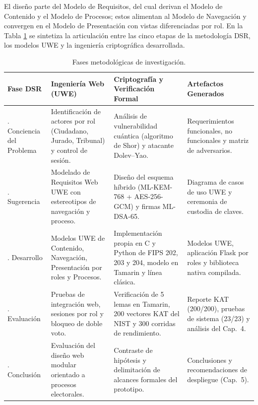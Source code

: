 El diseño parte del Modelo de Requisitos, del cual derivan el Modelo de Contenido y el Modelo de Procesos; estos alimentan al Modelo de Navegación y convergen en el Modelo de Presentación con vistas diferenciadas por rol. En la Tabla \ref{tab:mapeo_dsr_uwe_cripto} se sintetiza la articulación entre las cinco etapas de la metodología DSR, los modelos UWE y la ingeniería criptográfica desarrollada.

\begin{table}[!htbp]
	\centering
	\renewcommand{\arraystretch}{1.22}
	\footnotesize
	\begin{tabularx}{\textwidth}{|>{\bfseries\raggedright\arraybackslash}p{2.5cm}|>{\raggedright\arraybackslash}p{4.3cm}|>{\raggedright\arraybackslash}p{4.3cm}|>{\raggedright\arraybackslash}X|}
		\hline
		\textbf{Fase DSR} & \textbf{Ingeniería Web (UWE)} & \textbf{Criptografía y Verificación Formal} & \textbf{Artefactos Generados} \\
		\hline
		1. Conciencia del Problema & Identificación de actores por rol (Ciudadano, Jurado, Tribunal) y control de sesión. & Análisis de vulnerabilidad cuántica (algoritmo de Shor) y atacante Dolev--Yao. & Requerimientos funcionales, no funcionales y matriz de adversarios. \\
		\hline
		2. Sugerencia & Modelado de Requisitos Web UWE con estereotipos de navegación y proceso. & Diseño del esquema híbrido (ML-KEM-768 + AES-256-GCM) y firmas ML-DSA-65. & Diagrama de casos de uso UWE y ceremonia de custodia de claves. \\
		\hline
		3. Desarrollo & Modelos UWE de Contenido, Navegación, Presentación por roles y Procesos. & Implementación propia en C y Python de FIPS 202, 203 y 204, modelo en Tamarin y línea clásica. & Modelos UWE, aplicación Flask por roles y biblioteca nativa compilada. \\
		\hline
		4. Evaluación & Pruebas de integración web, sesiones por rol y bloqueo de doble voto. & Verificación de 5 lemas en Tamarin, 200 vectores KAT del NIST y 300 corridas de rendimiento. & Reporte KAT (200/200), pruebas de sistema (23/23) y análisis del Cap.\ 4. \\
		\hline
		5. Conclusión & Evaluación del diseño web modular orientado a procesos electorales. & Contraste de hipótesis y delimitación de alcances formales del prototipo. & Conclusiones y recomendaciones de despliegue (Cap.\ 5). \\
		\hline
	\end{tabularx}
	\caption{Fases metodológicas de investigación.}
	\label{tab:mapeo_dsr_uwe_cripto}
	\par{}
\end{table}

